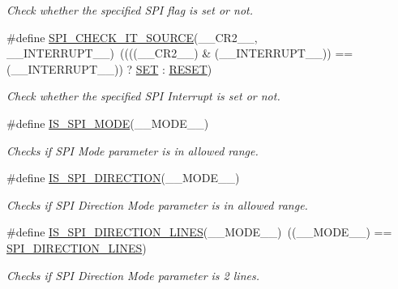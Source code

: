 \begin{DoxyCompactItemize}
\begin{DoxyCompactList}\small\item\em Check whether the specified S\+PI flag is set or not. \end{DoxyCompactList}\item 
\#define \hyperlink{group___s_p_i___private___macros_ga8ab087388d8930531498165ac8f066a2}{S\+P\+I\+\_\+\+C\+H\+E\+C\+K\+\_\+\+I\+T\+\_\+\+S\+O\+U\+R\+CE}(\+\_\+\+\_\+\+C\+R2\+\_\+\+\_\+,  \+\_\+\+\_\+\+I\+N\+T\+E\+R\+R\+U\+P\+T\+\_\+\+\_\+)~((((\+\_\+\+\_\+\+C\+R2\+\_\+\+\_\+) \& (\+\_\+\+\_\+\+I\+N\+T\+E\+R\+R\+U\+P\+T\+\_\+\+\_\+)) == (\+\_\+\+\_\+\+I\+N\+T\+E\+R\+R\+U\+P\+T\+\_\+\+\_\+)) ? \hyperlink{group___exported__types_gga89136caac2e14c55151f527ac02daaffab44c8101cc294c074709ec1b14211792}{S\+ET} \+: \hyperlink{group___exported__types_gga89136caac2e14c55151f527ac02daaffa589b7d94a3d91d145720e2fed0eb3a05}{R\+E\+S\+ET})
\begin{DoxyCompactList}\small\item\em Check whether the specified S\+PI Interrupt is set or not. \end{DoxyCompactList}\item 
\#define \hyperlink{group___s_p_i___private___macros_ga3dd95189a3729f12ca354b757519ca01}{I\+S\+\_\+\+S\+P\+I\+\_\+\+M\+O\+DE}(\+\_\+\+\_\+\+M\+O\+D\+E\+\_\+\+\_\+)
\begin{DoxyCompactList}\small\item\em Checks if S\+PI Mode parameter is in allowed range. \end{DoxyCompactList}\item 
\#define \hyperlink{group___s_p_i___private___macros_ga6c66285d42fc3baf5ecaceadb54ee42a}{I\+S\+\_\+\+S\+P\+I\+\_\+\+D\+I\+R\+E\+C\+T\+I\+ON}(\+\_\+\+\_\+\+M\+O\+D\+E\+\_\+\+\_\+)
\begin{DoxyCompactList}\small\item\em Checks if S\+PI Direction Mode parameter is in allowed range. \end{DoxyCompactList}\item 
\#define \hyperlink{group___s_p_i___private___macros_gaff84471ab30ddd79cefd0c43dfe628c8}{I\+S\+\_\+\+S\+P\+I\+\_\+\+D\+I\+R\+E\+C\+T\+I\+O\+N\+\_\+L\+I\+N\+ES}(\+\_\+\+\_\+\+M\+O\+D\+E\+\_\+\+\_\+)~((\+\_\+\+\_\+\+M\+O\+D\+E\+\_\+\+\_\+) == \hyperlink{group___s_p_i___direction_gaa7cb7f4bf4eebbf91bcfaeb17ebba7f3}{S\+P\+I\+\_\+\+D\+I\+R\+E\+C\+T\+I\+O\+N\+\_\+L\+I\+N\+ES})
\begin{DoxyCompactList}\small\item\em Checks if S\+PI Direction Mode parameter is 2 lines. \end{DoxyCompactList}\item 

\end{DoxyCompactItemize}
